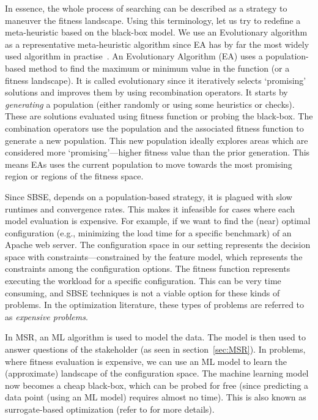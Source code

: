 \documentclass[table, xcdraw, sigconf,review, anonymous]{acmart}
\begin{document}
In essence, the whole process of searching can be described as a strategy to maneuver the fitness landscape. Using this terminology, let us try to redefine a meta-heuristic based on the black-box model. We use an Evolutionary algorithm as a representative meta-heuristic algorithm since EA has by far the most widely used algorithm in practise~\cite{nair2016accidental}.
An Evolutionary Algorithm (EA) uses a population-based method to find the maximum or minimum value in the function (or a fitness landscape). It is called evolutionary since it iteratively selects `promising' solutions and improves them by using recombination operators. It starts by \textit{generating} a population (either randomly or using some heuristics or checks). These are solutions evaluated using fitness function or probing the black-box. The combination operators use the population and the associated fitness function to generate a new population. This new population ideally explores areas which are considered more `promising'---higher fitness value than the prior generation. This means EAs uses the current population to move towards the most promising region or regions of the fitness space. 

Since SBSE, depends on a population-based strategy, it is plagued with slow runtimes and convergence rates. This makes it infeasible for cases where each model evaluation is expensive. For example, if we want to find the (near) optimal configuration (e.g., minimizing the load time for a specific benchmark) of an Apache web server. The configuration space in our setting represents the decision space with constraints---constrained by the feature model, which represents the constraints among the configuration options. The fitness function represents executing the workload for a specific configuration. This can be very time consuming, and SBSE techniques is not a viable option for these kinds of problems. In the optimization literature, these types of problems are referred to as \textit{expensive problems}. 

In MSR, an ML algorithm is used to model the data. The model is then used to answer questions of the stakeholder (as seen in section~\ref{sec:MSR}). In problems, where fitness evaluation is expensive, we can use an ML model to learn the (approximate) landscape of the configuration space. The machine learning model now becomes a cheap black-box, which can be probed for free (since predicting a data point (using an ML model) requires almost no time). This is also known as surrogate-based optimization (refer to \cite{jin2011surrogate} for more details). 
\end{document}

